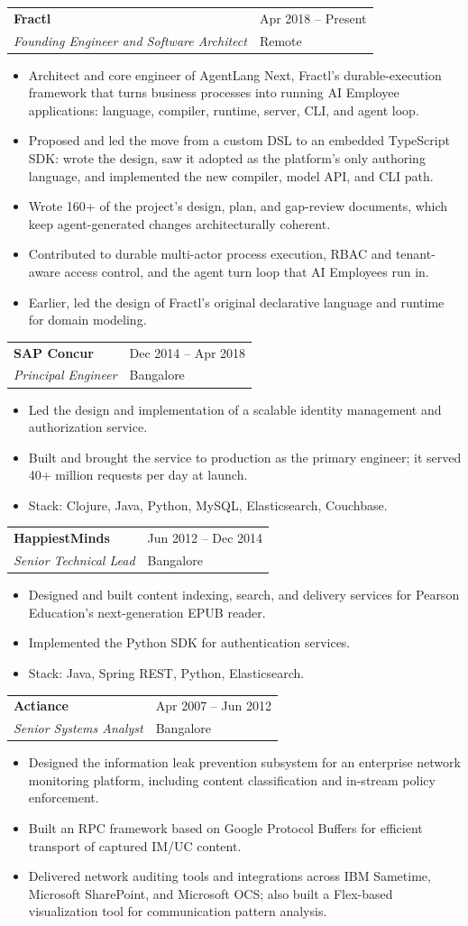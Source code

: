 \documentclass[10pt,letterpaper]{article}
\makeatletter
\newcommand{\entry}[4]{
  \vspace{0.25em}
  \begin{tabularx}{\textwidth}{@{}X>{\raggedleft\arraybackslash}p{2.35in}@{}}
    {\bfseries #1} & {\small\color{muted} #2} \\
    {\itshape #3} & {\small\color{muted} #4} \\
  \end{tabularx}\vspace{0.1em}
}
\makeatother
\begin{document}
\entry{Fractl}{Apr 2018 -- Present}{Founding Engineer and Software Architect}{Remote}
\begin{itemize}
  \item Architect and core engineer of AgentLang Next, Fractl's durable-execution framework that turns business processes into running AI Employee applications: language, compiler, runtime, server, CLI, and agent loop.
  \item Proposed and led the move from a custom DSL to an embedded TypeScript SDK: wrote the design, saw it adopted as the platform's only authoring language, and implemented the new compiler, model API, and CLI path.
  \item Wrote 160+ of the project's design, plan, and gap-review documents, which keep agent-generated changes architecturally coherent.
  \item Contributed to durable multi-actor process execution, RBAC and tenant-aware access control, and the agent turn loop that AI Employees run in.
  \item Earlier, led the design of Fractl's original declarative language and runtime for domain modeling.
\end{itemize}

\entry{SAP Concur}{Dec 2014 -- Apr 2018}{Principal Engineer}{Bangalore}
\begin{itemize}
  \item Led the design and implementation of a scalable identity management and authorization service.
  \item Built and brought the service to production as the primary engineer; it served 40+ million requests per day at launch.
  \item Stack: Clojure, Java, Python, MySQL, Elasticsearch, Couchbase.
\end{itemize}

\entry{HappiestMinds}{Jun 2012 -- Dec 2014}{Senior Technical Lead}{Bangalore}
\begin{itemize}
  \item Designed and built content indexing, search, and delivery services for Pearson Education's next-generation EPUB reader.
  \item Implemented the Python SDK for authentication services.
  \item Stack: Java, Spring REST, Python, Elasticsearch.
\end{itemize}

\entry{Actiance}{Apr 2007 -- Jun 2012}{Senior Systems Analyst}{Bangalore}
\begin{itemize}
  \item Designed the information leak prevention subsystem for an enterprise network monitoring platform, including content classification and in-stream policy enforcement.
  \item Built an RPC framework based on Google Protocol Buffers for efficient transport of captured IM/UC content.
  \item Delivered network auditing tools and integrations across IBM Sametime, Microsoft SharePoint, and Microsoft OCS; also built a Flex-based visualization tool for communication pattern analysis.
\end{itemize}
\end{document}
